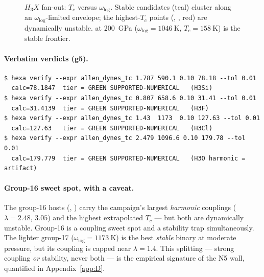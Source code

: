 \begin{figure}[h]
\centering
{}
\caption{$H_3X$ fan-out: $T_c$ versus $\omega_{\log}$. Stable candidates
(teal) cluster along an $\omega_{\log}$-limited envelope; the highest-$T_c$
points (, , red) are dynamically unstable.  at
\SI{200}{\giga\pascal} ($\omega_{\log}=\SI{1046}{\kelvin}$,
$T_c=\SI{158}{\kelvin}$) is the stable frontier.}
\label{fig:fanout-scatter}
\end{figure}

\paragraph{Verbatim verdicts (g5).}
\begin{lstlisting}[basicstyle=\ttfamily\footnotesize,frame=single,xleftmargin=0pt]
$ hexa verify --expr allen_dynes_tc 1.787 590.1 0.10 78.18 --tol 0.01
  calc=78.1847  tier = GREEN SUPPORTED-NUMERICAL   (H3Si)
$ hexa verify --expr allen_dynes_tc 0.807 658.6 0.10 31.41 --tol 0.01
  calc=31.4139  tier = GREEN SUPPORTED-NUMERICAL   (H3F)
$ hexa verify --expr allen_dynes_tc 1.43  1173  0.10 127.63 --tol 0.01
  calc=127.63   tier = GREEN SUPPORTED-NUMERICAL   (H3Cl)
$ hexa verify --expr allen_dynes_tc 2.479 1096.6 0.10 179.78 --tol 0.01
  calc=179.779  tier = GREEN SUPPORTED-NUMERICAL   (H3O harmonic = artifact)
\end{lstlisting}

\paragraph{Group-16 sweet spot, with a caveat.}
The group-16 hosts (, ) carry the campaign's largest
\emph{harmonic} couplings ($\lambda = 2.48$, $3.05$) and the highest extrapolated
$T_c$ --- but both are dynamically unstable. Group-16 is a coupling sweet
spot and a stability trap simultaneously. The lighter group-17 
($\omega_{\log} = \SI{1173}{\kelvin}$) is the best \emph{stable} binary at
moderate pressure, but its coupling is capped near $\lambda = 1.4$. This
splitting --- strong coupling \emph{or} stability, never both --- is the
empirical signature of the N5 wall, quantified in Appendix~\ref{app:D}.
